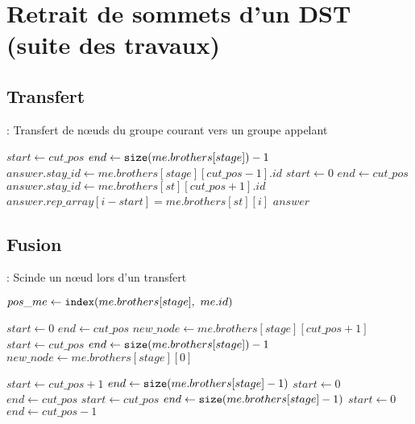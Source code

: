 
\chapter{Retrait de sommets d'un DST (suite des travaux)}
\section{Transfert}

\begin{algorithm}
\caption{: Transfert de n\oe uds du groupe courant vers un groupe appelant}\label{a:tr}
\begin{algorithmic}[1]
\Statex
{}
		\State $start \gets cut\_pos$
		\State $end \gets {\tt size}(me.brothers[stage]) - 1$
		\State $answer.stay\_id \gets me.brothers[stage][cut\_pos - 1].id$
	\Else
		\State $start \gets 0$
		\State $end \gets cut\_pos$
		\State $answer.stay\_id \gets me.brothers[st][cut\_pos + 1].id$
	\EndIf
	\Statex
		\State $answer.rep\_array[i - start] = me.brothers[st][i]$
	\EndFor
	\Statex
	\State {}
	\Statex
	\State \Return $answer$
\EndProcedure
\end{algorithmic}
\end{algorithm}

\section{Fusion}

\begin{algorithm}
\caption{: Scinde un n\oe ud lors d'un transfert}\label{a:cn}
\begin{algorithmic}[1]
\Statex
{}
	\State $pos\_me \gets {\tt index}(me.brothers[stage],\ me.id)$
	\Statex
	
		\State $start \gets 0$
		\State $end \gets cut\_pos$
		\State $new\_node \gets me.brothers[stage][cut\_pos + 1]$
	\Else
		\State $start \gets cut\_pos$
		\State $end \gets {\tt size}(me.brothers[stage]) - 1$
		\State $new\_node \gets me.brothers[stage][0]$
	\EndIf
	\Statex
	
		\State {}
	\EndIf
	\Statex
	
			\State $start \gets cut\_pos + 1$
			\State $end \gets {\tt size}(me.brothers[stage] - 1)$
		\Else
			\State $start \gets 0$
			\State $end \gets cut\_pos$
		\EndIf
	\Else
			\State $start \gets cut\_pos$
			\State $end \gets {\tt size}(me.brothers[stage] - 1)$
		\Else
			\State $start \gets 0$
			\State $end \gets cut\_pos - 1$
		\EndIf
	\EndIf
	\Statex
	
	\State {}
\EndProcedure
\end{algorithmic}
\end{algorithm}